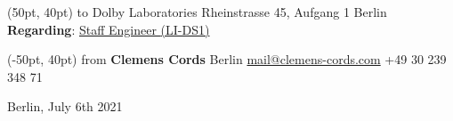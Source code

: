 \documentclass[11pt]{article}
\newcommand{\muted}{\color{muted_grey}}
\begin{document}
\begin{textblock*}{\paperwidth}(50pt, 40pt)
\flushleft
\:\newline
{\muted \small to}\linebreak
Dolby Laboratories\linebreak
Rheinstrasse 45, Aufgang 1 Berlin\linebreak
\newline
\textbf{Regarding}: \href{https://careers.dolby.com/job/Berlin-Staff-Engineer-%28fmd%29/740864600/}{Staff Engineer {\muted(LI-DS1)}}
\end{textblock*}

\begin{textblock*}{\paperwidth}(-50pt, 40pt)
\flushright
{\muted \small from}\linebreak
{\Large \textbf{Clemens Cords}} Berlin\linebreak
\newline
\href{mailto:mail@clemens-cords.com}{mail@clemens-cords.com}\linebreak
+49 30 239 348 71 \linebreak
\newline
\newline
\end{textblock*}

\begin{flushright}
Berlin, July 6th 2021
\end{flushright}
\end{document}
